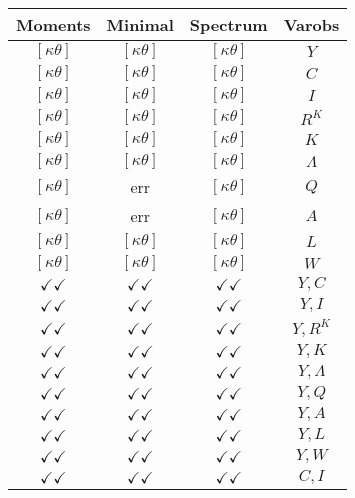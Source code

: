 \documentclass[a4paper,10pt]{article}
\begin{document}
\centering
\begin{longtable}{|c|c|c|c|}
\hline
Moments & Minimal & Spectrum & Varobs \\
\hline
$[\kappa \theta ]$ & $[\kappa \theta ]$ & $[\kappa \theta ]$ & ${Y}$ \\
\hline
$[\kappa \theta ]$ & $[\kappa \theta ]$ & $[\kappa \theta ]$ & ${C}$ \\
\hline
$[\kappa \theta ]$ & $[\kappa \theta ]$ & $[\kappa \theta ]$ & ${I}$ \\
\hline
$[\kappa \theta ]$ & $[\kappa \theta ]$ & $[\kappa \theta ]$ & ${R^{K}}$ \\
\hline
$[\kappa \theta ]$ & $[\kappa \theta ]$ & $[\kappa \theta ]$ & ${K}$ \\
\hline
$[\kappa \theta ]$ & $[\kappa \theta ]$ & $[\kappa \theta ]$ & ${\Lambda}$ \\
\hline
$[\kappa \theta ]$ & err & $[\kappa \theta ]$ & ${Q}$ \\
\hline
$[\kappa \theta ]$ & err & $[\kappa \theta ]$ & ${A}$ \\
\hline
$[\kappa \theta ]$ & $[\kappa \theta ]$ & $[\kappa \theta ]$ & ${L}$ \\
\hline
$[\kappa \theta ]$ & $[\kappa \theta ]$ & $[\kappa \theta ]$ & ${W}$ \\
\hline
$\checkmark\checkmark$ & $\checkmark\checkmark$ & $\checkmark\checkmark$ & ${Y},{C}$ \\
\hline
$\checkmark\checkmark$ & $\checkmark\checkmark$ & $\checkmark\checkmark$ & ${Y},{I}$ \\
\hline
$\checkmark\checkmark$ & $\checkmark\checkmark$ & $\checkmark\checkmark$ & ${Y},{R^{K}}$ \\
\hline
$\checkmark\checkmark$ & $\checkmark\checkmark$ & $\checkmark\checkmark$ & ${Y},{K}$ \\
\hline
$\checkmark\checkmark$ & $\checkmark\checkmark$ & $\checkmark\checkmark$ & ${Y},{\Lambda}$ \\
\hline
$\checkmark\checkmark$ & $\checkmark\checkmark$ & $\checkmark\checkmark$ & ${Y},{Q}$ \\
\hline
$\checkmark\checkmark$ & $\checkmark\checkmark$ & $\checkmark\checkmark$ & ${Y},{A}$ \\
\hline
$\checkmark\checkmark$ & $\checkmark\checkmark$ & $\checkmark\checkmark$ & ${Y},{L}$ \\
\hline
$\checkmark\checkmark$ & $\checkmark\checkmark$ & $\checkmark\checkmark$ & ${Y},{W}$ \\
\hline
$\checkmark\checkmark$ & $\checkmark\checkmark$ & $\checkmark\checkmark$ & ${C},{I}$ \\

\end{longtable}
\end{document}
